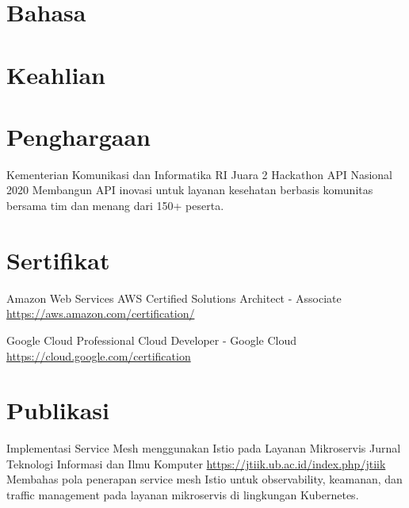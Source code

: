 \documentclass[a4paper, serif, 10pt]{moderncv}
\begin{document}
\section{Bahasa}

\section{Keahlian}

\section{Penghargaan}

        {Kementerian Komunikasi dan Informatika RI}
        {Juara 2 Hackathon API Nasional 2020}
        {}
        {}
        {Membangun API inovasi untuk layanan kesehatan berbasis komunitas bersama tim dan menang dari 150+ peserta.}
\section{Sertifikat}

        {Amazon Web Services}
        {AWS Certified Solutions Architect - Associate}
        {\url{https://aws.amazon.com/certification/}}
        {}
        {}

        {Google Cloud}
        {Professional Cloud Developer - Google Cloud}
        {\url{https://cloud.google.com/certification}}
        {}
        {}
\section{Publikasi}

        {Implementasi Service Mesh menggunakan Istio pada Layanan Mikroservis}
        {Jurnal Teknologi Informasi dan Ilmu Komputer}
        {\url{https://jtiik.ub.ac.id/index.php/jtiik}}
        {}
        {Membahas pola penerapan service mesh Istio untuk observability, keamanan, dan traffic management pada layanan mikroservis di lingkungan Kubernetes.}
\end{document}
